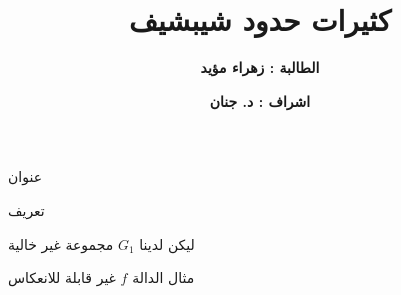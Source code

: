 \documentclass[dvipsnames,mathserif]{beamer}
\title{\textbf{كثيرات حدود شيبشيف}}
\author{\textbf{الطالبة : زهراء مؤيد}}
\date{\textbf{اشراف : د. جنان}}
\begin{document}
	\begin{frame}
		\maketitle
	\end{frame}
\begin{frame}{عنوان}
		\pause
\begin{exampleblock}{تعريف}

ليكن لدينا $G_1$ مجموعة غير خالية
\end{exampleblock}
\pause
\begin{exampleblock}{مثال}
	الدالة $f$ غير قابلة للانعكاس
\end{exampleblock}
\end{frame}
\end{document}
